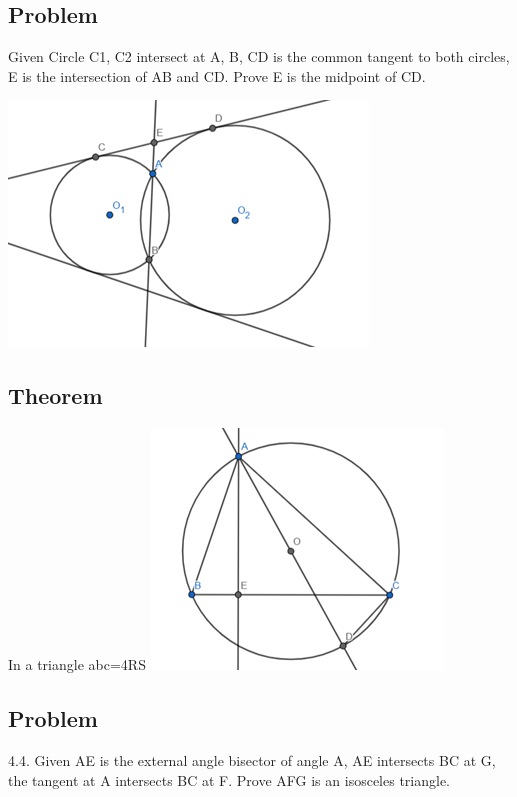\documentclass{article}
\begin{document}
\vspace{50px}

\subsection{Problem}
Given Circle C1, C2 intersect at A, B, CD is the common tangent to both circles, 
E is the intersection of AB and CD. Prove E is the midpoint of CD.

\includegraphics{Picture17.png}

\pagebreak

\subsection{Theorem}
In a triangle abc=4RS
\includegraphics{Picture18.png}

\pagebreak

\subsection{Problem}

4.4.	Given AE is the external angle bisector of angle A, 
AE intersects BC at G, 
the tangent at A intersects BC at F. 
Prove AFG is an isosceles triangle.
\end{document}
